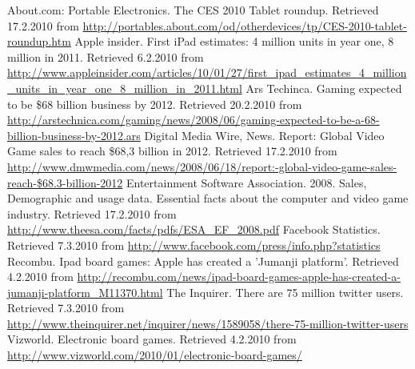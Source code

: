 \documentclass[12pt,a4paper]{article}
\begin{document}
\begin{thebibliography}{10}
 About.com: Portable Electronics. The CES 2010 Tablet roundup. 
Retrieved 17.2.2010 from \url{http://portables.about.com/od/otherdevices/tp/CES-2010-tablet-roundup.htm}
 Apple insider. First iPad estimates: 4 million units in year one, 8 million in 2011. 
Retrieved 6.2.2010 from \url{http://www.appleinsider.com/articles/10/01/27/first_ipad_estimates_4_million_units_in_year_one_8_million_in_2011.html}
 Ars Techinca. Gaming expected to be \$68 billion business by 2012. 
Retrieved 20.2.2010 from \url{http://arstechnica.com/gaming/news/2008/06/gaming-expected-to-be-a-68-billion-business-by-2012.ars}
 Digital Media Wire, News. Report: Global Video Game sales to reach \$68,3 billion in 2012.
Retrieved 17.2.2010 from \url{http://www.dmwmedia.com/news/2008/06/18/report:-global-video-game-sales-reach-$68.3-billion-2012}
Entertainment Software Association. 2008. Sales, Demographic and usage data. Essential facts about the computer and video game industry. 
Retrieved 17.2.2010 from \url{http://www.theesa.com/facts/pdfs/ESA_EF_2008.pdf}
 Facebook Statistics. 
Retrieved 7.3.2010 from \url{http://www.facebook.com/press/info.php?statistics}
 Recombu. Ipad board games: Apple has created a 'Jumanji platform'. 
Retrieved 4.2.2010 from \url{http://recombu.com/news/ipad-board-games-apple-has-created-a-jumanji-platform_M11370.html}
 The Inquirer. There are 75 million twitter users. 
Retrieved  7.3.2010 from \url{http://www.theinquirer.net/inquirer/news/1589058/there-75-million-twitter-users}
 Vizworld. Electronic board games. 
Retrieved 4.2.2010 from \url{http://www.vizworld.com/2010/01/electronic-board-games/}
\end{thebibliography}
\end{document}
